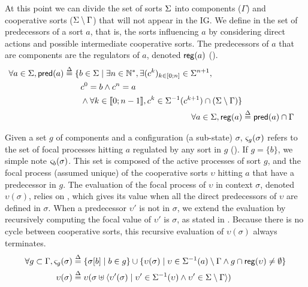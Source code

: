 At this point we can divide the set of sorts $\Sigma$ into components ($\Gamma$) and cooperative sorts
($\Sigma \setminus \Gamma$) that will not appear in the IG. 
We define in  the set of predecessors of a sort $a$, that is, the sorts influencing $a$
by considering direct actions and possible intermediate cooperative sorts.
The predecessors of $a$ that are components are the regulators of $a$, denoted $\mathsf{reg}({a})$
().
\begin{align}
\begin{split}
\forall a \in \Sigma, \mathsf{pred}(a) &\stackrel{\Delta}= \{b \in \Sigma \mid \exists n \in \mathbb{N}^*, \exists
(c^k)_{k \in [0;n]} \in \Sigma^{n+1}, \\
                                   & \quad \quad c^0 = b \wedge c^n = a \\
                                   & \quad \quad \wedge \forall k \in \llbracket 0 ; n-1 \rrbracket,
								   c^k \in \Sigma^{-1}(c^{k+1}) \cap (\Sigma\setminus\Gamma)\}
\end{split}
\label{eq:ph_predec}
\\
\forall a\in \Sigma, \mathsf{reg}({a}) & \stackrel{\Delta}= \mathsf{pred}(a) \cap \Gamma
\label{eq:regulators}
\end{align}

Given a set $g$ of components and a configuration (\ie a sub-state) $\sigma$, $\varsigma_g(\sigma)$
refers to the set of focal processes hitting $a$ regulated by any sort in $g$ ().
If $g=\{b\}$, we simple note $\varsigma_b(\sigma)$.
This set is composed of the active processes of sort $g$, and the focal process (assumed
unique) of the cooperative sorts $\upsilon$ hitting $a$ that have a predecessor in $g$.
The evaluation of the focal process of $\upsilon$ in context $\sigma$, denoted $\upsilon(\sigma)$,
relies on , which gives its value when all the direct predecessors of
$\upsilon$ are defined in $\sigma$.
When a predecessor $\upsilon'$ is not in $\sigma$, we extend the evaluation by recursively computing
the focal value of $\upsilon'$ is $\sigma$, as stated in .
Because there is no cycle between cooperative sorts, this recursive evaluation of $\upsilon(\sigma)$
always terminates.
\begin{align}
\forall g\subset \Gamma,
	\varsigma_g(\sigma) & \stackrel{\Delta}= \{ \sigma[b] \mid b\in g \} \cup \{ \upsilon(\sigma) \mid
\upsilon\in\Sigma^{-1}(a) \setminus \Gamma \wedge g\cap \mathsf{reg}({\upsilon}) \neq \emptyset \}
\label{eq:ctx-sigma}
\\
\upsilon(\sigma) & \stackrel{\Delta}=
\upsilon(\sigma \uplus \langle \upsilon'(\sigma) \mid 
	\upsilon'\in\Sigma^{-1}(\upsilon) \wedge
	\upsilon'\in\Sigma\setminus\Gamma  \rangle)
\label{eq:cooperative-eval}
\end{align}

